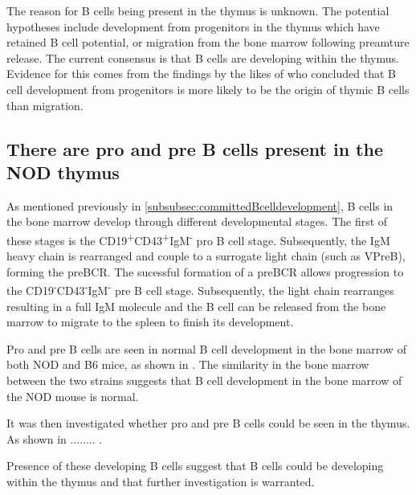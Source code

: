   

The reason for B cells being present in the thymus is unknown. 
The potential hypotheses include development from progenitors in the thymus which have retained B cell potential, or migration from the bone marrow following preamture release.
The current consensus is that B cells are developing within the thymus. Evidence for this comes from the findings by the likes of \citet{Perrera2013} who concluded that B cell development from progenitors is more likely to be the origin of thymic B cells than migration.


\subsection{There are pro and pre B cells present in the NOD thymus}
\label{subsec:proandpre}


As mentioned previously in \cref{subsubsec:committedBcelldevelopment}, B cells in the bone marrow develop through different developmental stages.
The first of these stages is the CD19\textsuperscript{+}CD43\textsuperscript{+}IgM\textsuperscript{-} pro B cell stage.
Subsequently, the IgM heavy chain is rearranged and couple to a surrogate light chain (such as VPreB), forming the preBCR.
The sucessful formation of a preBCR allows progression to the CD19\textsuperscript{-}CD43\textsuperscript{-}IgM\textsuperscript{-} pre B cell stage.
Subsequently, the light chain rearranges resulting in a full IgM molecule and the B cell can be released from the bone marrow to migrate to the spleen to finish its development.

Pro and pre B cells are seen in normal B cell development in the bone marrow of both NOD and B6 mice, as shown in .
The similarity in the bone marrow between the two strains suggests that B cell development in the bone marrow of the NOD mouse is normal.

It was then investigated whether pro and pre B cells could be seen in the thymus.
As shown in ........ .

Presence of these developing B cells suggest that B cells could be developing within the thymus and that further investigation is warranted.






